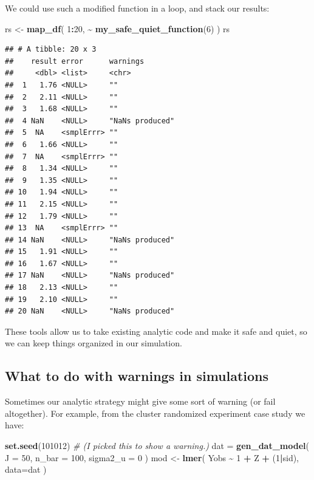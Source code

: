 \documentclass[
]{book}
\newenvironment{Shaded}{\begin{snugshade}}{\end{snugshade}}
\newcommand{\AttributeTok}[1]{\textcolor[rgb]{0.13,0.29,0.53}{#1}}
\newcommand{\CommentTok}[1]{\textcolor[rgb]{0.56,0.35,0.01}{\textit{#1}}}
\newcommand{\DecValTok}[1]{\textcolor[rgb]{0.00,0.00,0.81}{#1}}
\newcommand{\FunctionTok}[1]{\textcolor[rgb]{0.13,0.29,0.53}{\textbf{#1}}}
\newcommand{\NormalTok}[1]{#1}
\newcommand{\OtherTok}[1]{\textcolor[rgb]{0.56,0.35,0.01}{#1}}
\newcommand{\SpecialCharTok}[1]{\textcolor[rgb]{0.81,0.36,0.00}{\textbf{#1}}}
\begin{document}
We could use such a modified function in a loop, and stack our results:

\begin{Shaded}
\begin{Highlighting}[]
\NormalTok{rs }\OtherTok{\textless{}{-}} \FunctionTok{map\_df}\NormalTok{( }\DecValTok{1}\SpecialCharTok{:}\DecValTok{20}\NormalTok{, }\SpecialCharTok{\textasciitilde{}} \FunctionTok{my\_safe\_quiet\_function}\NormalTok{(}\DecValTok{6}\NormalTok{) )}
\NormalTok{rs}
\end{Highlighting}
\end{Shaded}

\begin{verbatim}
## # A tibble: 20 x 3
##    result error      warnings       
##     <dbl> <list>     <chr>          
##  1   1.76 <NULL>     ""             
##  2   2.11 <NULL>     ""             
##  3   1.68 <NULL>     ""             
##  4 NaN    <NULL>     "NaNs produced"
##  5  NA    <smplErrr> ""             
##  6   1.66 <NULL>     ""             
##  7  NA    <smplErrr> ""             
##  8   1.34 <NULL>     ""             
##  9   1.35 <NULL>     ""             
## 10   1.94 <NULL>     ""             
## 11   2.15 <NULL>     ""             
## 12   1.79 <NULL>     ""             
## 13  NA    <smplErrr> ""             
## 14 NaN    <NULL>     "NaNs produced"
## 15   1.91 <NULL>     ""             
## 16   1.67 <NULL>     ""             
## 17 NaN    <NULL>     "NaNs produced"
## 18   2.13 <NULL>     ""             
## 19   2.10 <NULL>     ""             
## 20 NaN    <NULL>     "NaNs produced"
\end{verbatim}

These tools allow us to take existing analytic code and make it safe and quiet, so we can keep things organized in our simulation.

\subsection{What to do with warnings in simulations}\label{what-to-do-with-warnings-in-simulations}

Sometimes our analytic strategy might give some sort of warning (or fail altogether).
For example, from the cluster randomized experiment case study we have:

\begin{Shaded}
\begin{Highlighting}[]
\FunctionTok{set.seed}\NormalTok{(}\DecValTok{101012}\NormalTok{)  }\CommentTok{\# (I picked this to show a warning.)}
\NormalTok{dat }\OtherTok{=} \FunctionTok{gen\_dat\_model}\NormalTok{( }\AttributeTok{J =} \DecValTok{50}\NormalTok{, }\AttributeTok{n\_bar =} \DecValTok{100}\NormalTok{, }\AttributeTok{sigma2\_u =} \DecValTok{0}\NormalTok{ )}
\NormalTok{mod }\OtherTok{\textless{}{-}} \FunctionTok{lmer}\NormalTok{( Yobs }\SpecialCharTok{\textasciitilde{}} \DecValTok{1} \SpecialCharTok{+}\NormalTok{ Z }\SpecialCharTok{+}\NormalTok{ (}\DecValTok{1}\SpecialCharTok{|}\NormalTok{sid), }\AttributeTok{data=}\NormalTok{dat )}
\end{Highlighting}
\end{Shaded}
\end{document}
